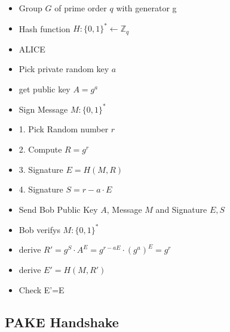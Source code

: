 \documentclass[journal]{IEEEtran}
\begin{document}
    \begin{itemize}[] %
        \item Group $G$ of prime order $q$ with generator g
        \item Hash function $H: \{0,1\}^* \leftarrow \mathbb{Z}_q$ 
        \item ALICE
        \item Pick private random key $a$
        \item get public key $A = g^a$
        \item Sign Message $M: \{0,1\}^*$
        \item 1. Pick Random number $r$
        \item 2. Compute $R = g^r$ 
        \item 3. Signature $E = H(M, R)$
        \item 4. Signature $S = r - a \cdot E$
        \item Send Bob Public Key $A$, Message $M$ and Signature $E,S$
        \item Bob verifys $M: \{0,1\}^*$
        \item derive $ R' = g^S \cdot A^E = g^{r - aE} \cdot (g^a)^E = g^r $
        \item derive $ E' = H(M,R') $
        \item Check E'=E
    \end{itemize}
\subsection{PAKE Handshake}
\end{document}
